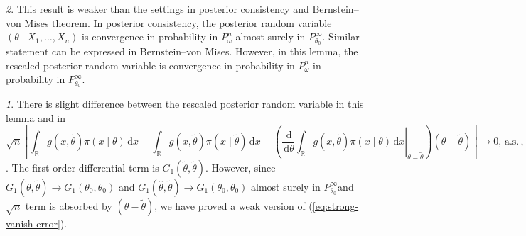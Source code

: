 \documentclass[oneside,english]{amsbook}
\numberwithin{section}{chapter}
\numberwithin{equation}{section}
\numberwithin{figure}{section}
\theoremstyle{plain}
\theoremstyle{plain}
\theoremstyle{definition}
\theoremstyle{plain}
\theoremstyle{plain}
\theoremstyle{remark}
\newtheorem{rem}{\protect\remarkname}
\theoremstyle{definition}
\theoremstyle{definition}
\newcommand{\diff}{\,\mathrm{d}}
\newcommand{\ascv}{\,\mathrm{a.s.}\,}
\providecommand{\remarkname}{Remark}
\begin{document}
\begin{rem}
This result is weaker than the settings in posterior consistency and
Bernstein--von Mises theorem. In posterior consistency, the posterior
random variable $\left(\theta\mid X_{1},\ldots,X_{n}\right)$ is convergence
in probability in $P_{\omega}^{n}$ almost surely in $P_{\theta_{0}}^{\infty}$.
Similar statement can be expressed in Bernstein--von Mises. However,
in this lemma, the rescaled posterior random variable is convergence
in probability in $P_{\omega}^{n}$ in probability in $P_{\theta_{0}}^{\infty}$. 
\begin{rem}
There is slight difference between the rescaled posterior random variable
in this lemma and in 
\begin{equation}
\sqrt{n}\left[\int_{\mathbb{R}}g\left(x,\tilde{\theta}\right)\pi\left(x\mid\theta\right)\diff x-\int_{\mathbb{R}}g\left(x,\tilde{\theta}\right)\pi\left(x\mid\tilde{\theta}\right)\diff x-\left(\left.\frac{\diff}{\diff\theta}\int_{\mathbb{R}}g\left(x,\tilde{\theta}\right)\pi\left(x\mid\theta\right)\diff x\right|_{\theta=\tilde{\theta}}\right)\left(\theta-\tilde{\theta}\right)\right]\rightarrow0,\ascv,\label{eq:strong-vanish-error}
\end{equation}
. The first order differential term is $G_{1}\left(\tilde{\theta},\tilde{\theta}\right)$.
However, since $G_{1}\left(\tilde{\theta},\tilde{\theta}\right)\rightarrow G_{1}\left(\theta_{0},\theta_{0}\right)$
and $G_{1}\left(\hat{\theta},\tilde{\theta}\right)\rightarrow G_{1}\left(\theta_{0},\theta_{0}\right)$
almost surely in $P_{\theta_{0}}^{\infty}$and $\sqrt{n}$ term is
absorbed by $\left(\theta-\tilde{\theta}\right)$, we have proved
a weak version of (\ref{eq:strong-vanish-error}). 
\end{rem}
\end{rem}
\end{document}
